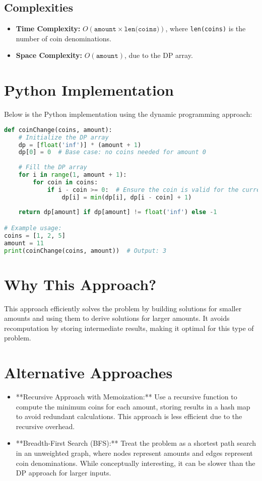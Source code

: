 \subsection*{Complexities}
\begin{itemize}
    \item \textbf{Time Complexity:} \( O(\texttt{amount} \times \texttt{len(coins)}) \), where \texttt{len(coins)} is the number of coin denominations.
    \item \textbf{Space Complexity:} \( O(\texttt{amount}) \), due to the DP array.
\end{itemize}

\section*{Python Implementation}
Below is the Python implementation using the dynamic programming approach:

\begin{fullwidth}
\begin{lstlisting}[language=Python]
def coinChange(coins, amount):
    # Initialize the DP array
    dp = [float('inf')] * (amount + 1)
    dp[0] = 0  # Base case: no coins needed for amount 0
    
    # Fill the DP array
    for i in range(1, amount + 1):
        for coin in coins:
            if i - coin >= 0:  # Ensure the coin is valid for the current amount
                dp[i] = min(dp[i], dp[i - coin] + 1)
    
    return dp[amount] if dp[amount] != float('inf') else -1

# Example usage:
coins = [1, 2, 5]
amount = 11
print(coinChange(coins, amount))  # Output: 3
\end{lstlisting}
\end{fullwidth}

\section*{Why This Approach?}
This approach efficiently solves the problem by building solutions for smaller amounts and using them to derive solutions for larger amounts. It avoids recomputation by storing intermediate results, making it optimal for this type of problem.

\section*{Alternative Approaches}
\begin{itemize}
    \item **Recursive Approach with Memoization:** Use a recursive function to compute the minimum coins for each amount, storing results in a hash map to avoid redundant calculations. This approach is less efficient due to the recursive overhead.
    \item **Breadth-First Search (BFS):** Treat the problem as a shortest path search in an unweighted graph, where nodes represent amounts and edges represent coin denominations. While conceptually interesting, it can be slower than the DP approach for larger inputs.
\end{itemize}

